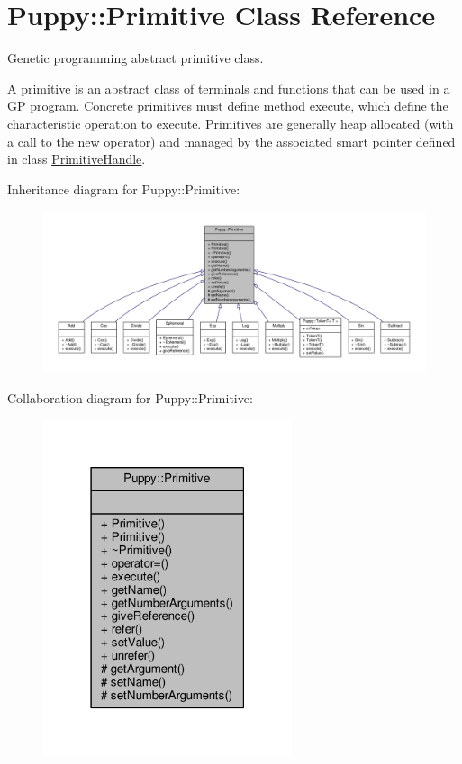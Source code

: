 \hypertarget{classPuppy_1_1Primitive}{}\section{Puppy\+:\+:Primitive Class Reference}
\label{classPuppy_1_1Primitive}


Genetic programming abstract primitive class.

A primitive is an abstract class of terminals and functions that can be used in a G\+P program. Concrete primitives must define method execute, which define the characteristic operation to execute. Primitives are generally heap allocated (with a call to the new operator) and managed by the associated smart pointer defined in class \hyperlink{classPuppy_1_1PrimitiveHandle}{Primitive\+Handle}.  




Inheritance diagram for Puppy\+:\+:Primitive\+:
\nopagebreak
\begin{figure}[H]
\begin{center}
\leavevmode
\includegraphics[width=350pt]{classPuppy_1_1Primitive__inherit__graph}
\end{center}
\end{figure}


Collaboration diagram for Puppy\+:\+:Primitive\+:
\nopagebreak
\begin{figure}[H]
\begin{center}
\leavevmode
\includegraphics[width=207pt]{classPuppy_1_1Primitive__coll__graph}
\end{center}
\end{figure}
